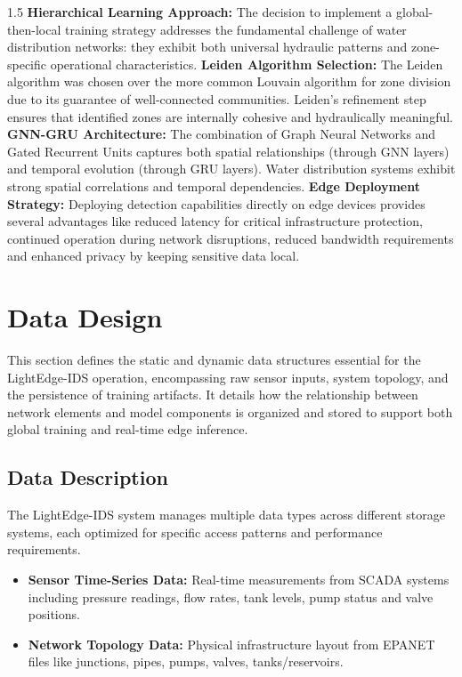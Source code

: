 \begin{spacing}{1.5}
\textbf{Hierarchical Learning Approach:}
The decision to implement a global-then-local training strategy addresses the fundamental challenge of water distribution networks: they exhibit both universal hydraulic patterns and zone-specific operational characteristics.
\bigbreak
\textbf{Leiden Algorithm Selection:}
The Leiden algorithm was chosen over the more common Louvain algorithm for zone division due to its guarantee of well-connected communities. Leiden's refinement step ensures that identified zones are internally cohesive and hydraulically meaningful.
\bigbreak
\textbf{GNN-GRU Architecture:}
The combination of Graph Neural Networks and Gated Recurrent Units captures both spatial relationships (through GNN layers) and temporal evolution (through GRU layers). Water distribution systems exhibit strong spatial correlations and temporal dependencies.
\bigbreak
\textbf{Edge Deployment Strategy:}
Deploying detection capabilities directly on edge devices provides several advantages like reduced latency for critical infrastructure protection, continued operation during network disruptions, reduced bandwidth requirements and enhanced privacy by keeping sensitive data local.



\newpage
\section{Data Design}
This section defines the static and dynamic data structures essential for the LightEdge-IDS operation, encompassing raw sensor inputs, system topology, and the persistence of training artifacts. It details how the relationship between network elements and model components is organized and stored to support both global training and real-time edge inference.
\subsection{Data Description}

The LightEdge-IDS system manages multiple data types across different storage systems, each optimized for specific access patterns and performance requirements.
\begin{itemize}

\item \textbf{Sensor Time-Series Data:} Real-time measurements from SCADA systems including pressure readings, flow rates, tank levels, pump status and valve positions. 

\item \textbf{Network Topology Data:} Physical infrastructure layout from EPANET files like junctions, pipes, pumps, valves, tanks/reservoirs.


\end{itemize}
\end{spacing}
